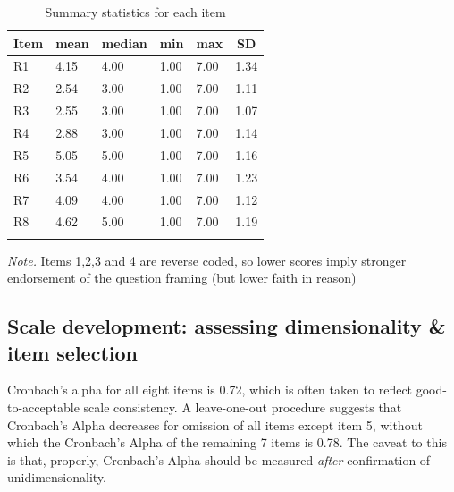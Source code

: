 \documentclass[
  ,jou,floatsintext]{apa6}
\begin{document}
\begin{table}[tbp]

\begin{center}
\begin{threeparttable}

\caption{\label{tab:itemmeans}Summary statistics for each item}

\begin{tabular}{llllll}
\toprule
Item & \multicolumn{1}{c}{mean} & \multicolumn{1}{c}{median} & \multicolumn{1}{c}{min} & \multicolumn{1}{c}{max} & \multicolumn{1}{c}{SD}\\
\midrule
R1 & 4.15 & 4.00 & 1.00 & 7.00 & 1.34\\
R2 & 2.54 & 3.00 & 1.00 & 7.00 & 1.11\\
R3 & 2.55 & 3.00 & 1.00 & 7.00 & 1.07\\
R4 & 2.88 & 3.00 & 1.00 & 7.00 & 1.14\\
R5 & 5.05 & 5.00 & 1.00 & 7.00 & 1.16\\
R6 & 3.54 & 4.00 & 1.00 & 7.00 & 1.23\\
R7 & 4.09 & 4.00 & 1.00 & 7.00 & 1.12\\
R8 & 4.62 & 5.00 & 1.00 & 7.00 & 1.19\\
\bottomrule
\addlinespace
\end{tabular}

\begin{tablenotes}[para]
\normalsize{\textit{Note.} Items 1,2,3 and 4 are reverse coded, so lower scores imply stronger endorsement of the question framing (but lower faith in reason)}
\end{tablenotes}

\end{threeparttable}
\end{center}

\end{table}

\hypertarget{scale-development-assessing-dimensionality-item-selection}{%
\subsection{Scale development: assessing dimensionality \& item selection}\label{scale-development-assessing-dimensionality-item-selection}}

Cronbach's alpha for all eight items is 0.72, which is often taken to reflect good-to-acceptable scale consistency. A leave-one-out procedure suggests that Cronbach's Alpha decreases for omission of all items except item 5, without which the Cronbach's Alpha of the remaining 7 items is 0.78. The caveat to this is that, properly, Cronbach's Alpha should be measured \emph{after} confirmation of unidimensionality.
\end{document}
